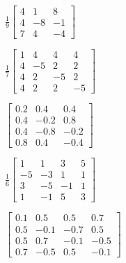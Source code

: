\begin{exercise}
\begin{Parts}
\begin{reduce}
\item \(\frac19\begin{bmatrix} 4&1&8
\\4&-8&-1
\\7&4&-4 \end{bmatrix}\)
\end{reduce}

\item \(\frac17\begin{bmatrix} 1&4&4&4
\\4&-5&2&2
\\4&2&-5&2
\\4&2&2&-5 \end{bmatrix}\)

\item \(\begin{bmatrix} 0.2&0.4&0.4
\\0.4&-0.2&0.8
\\0.4&-0.8&-0.2
\\0.8&0.4&-0.4 \end{bmatrix}\)

\item \(\frac16\begin{bmatrix} 1&1&3&5
\\-5&-3&1&1
\\3&-5&-1&1
\\1&-1&5&3 \end{bmatrix}\)

\item \(\begin{bmatrix} 0.1&0.5&0.5&0.7
\\0.5&-0.1&-0.7&0.5
\\0.5&0.7&-0.1&-0.5
\\0.7&-0.5&0.5&-0.1 \end{bmatrix}\)

\end{Parts}
\end{exercise}


